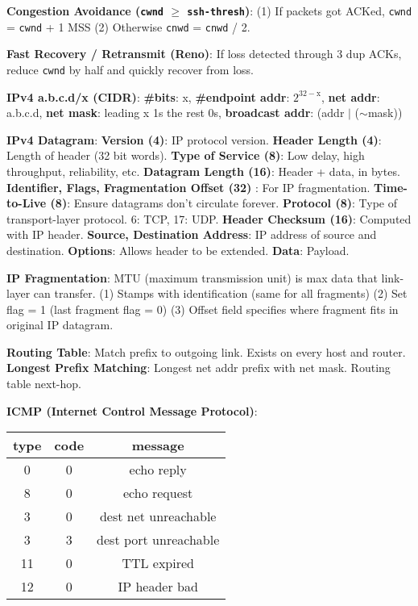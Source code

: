 \documentclass{scrartcl}
\begin{document}
\begin{multicols*}{3}
{\bf Congestion Avoidance (\texttt{cwnd} $\geq$ \texttt{ssh-thresh})}: (1) If packets got ACKed, \texttt{cwnd} = \texttt{cwnd} + 1 MSS (2) Otherwise \texttt{cnwd} = \texttt{cnwd} / 2.

{\bf Fast Recovery / Retransmit (Reno)}: If loss detected through 3 dup ACKs, reduce \texttt{cwnd} by half and quickly recover from loss.


{\bf IPv4 a.b.c.d/x (CIDR)}: {\bf \#bits}: x, {\bf \#endpoint addr}: $2^{32-\text{x}}$, {\bf net addr}: a.b.c.d, {\bf net mask}: leading x 1s the rest 0s, {\bf broadcast addr}: (addr $|$ ($\sim$mask))

{\bf IPv4 Datagram}:
{\bf Version (4)}: IP protocol version.
{\bf Header Length (4)}: Length of header (32 bit words).
{\bf Type of Service (8)}: Low delay, high throughput, reliability, etc.
{\bf Datagram Length (16)}: Header + data, in bytes.
{\bf Identifier, Flags, Fragmentation Offset (32)} : For IP fragmentation.
{\bf Time-to-Live (8)}: Ensure datagrams don't circulate forever.
{\bf Protocol (8)}: Type of transport-layer protocol. 6: TCP, 17: UDP.
{\bf Header Checksum (16)}: Computed with IP header.
{\bf Source, Destination Address}: IP address of source and destination.
{\bf Options}: Allows header to be extended.
{\bf Data}: Payload.


{\bf IP Fragmentation}: MTU (maximum transmission unit) is max data that link-layer can transfer. (1) Stamps with identification (same for all fragments) (2) Set flag = 1 (last fragment flag = 0) (3) Offset field specifies where fragment fits in original IP datagram.


{\bf Routing Table}: Match prefix to outgoing link. Exists on every host and router. {\bf Longest Prefix Matching}: Longest net addr prefix with net mask. Routing table next-hop.

{\bf ICMP (Internet Control Message Protocol)}: \begin{tabular}{c|c|c}
type & code & message \\
\hline
0 & 0 & echo reply \\
8 & 0 & echo request \\
3 & 0 & dest net unreachable \\
3 & 3 & dest port unreachable \\
11 & 0 & TTL expired \\
12 & 0 & IP header bad
\end{tabular}


\end{multicols*}
\end{document}
